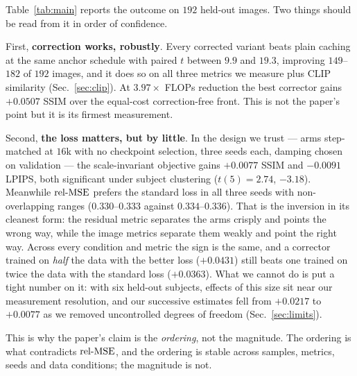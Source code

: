 Table~\ref{tab:main} reports the outcome on $192$ held-out images. Two things should
be read from it in order of confidence.

First, \textbf{correction works, robustly}. Every corrected variant beats plain caching
at the same anchor schedule with paired $t$ between $9.9$ and $19.3$, improving
$149$--$182$ of $192$ images, and it does so on all three metrics we measure plus CLIP
similarity (Sec.~\ref{sec:clip}). At $3.97\times$ FLOPs reduction the best corrector
gains $+0.0507$ SSIM over the equal-cost correction-free front. This is not the
paper's point but it is its firmest measurement.

Second, \textbf{the loss matters, but by little}. In the design we trust --- arms
step-matched at $16$k with no checkpoint selection, three seeds each, damping chosen on
validation --- the scale-invariant objective gains $+0.0077$ SSIM and $-0.0091$ LPIPS,
both significant under subject clustering ($t(5){=}2.74$, $-3.18$). Meanwhile
$\mathrm{rel\text{-}MSE}$ prefers the standard loss in all three seeds with non-overlapping ranges
($0.330$--$0.333$ against $0.334$--$0.336$). That is the inversion in its cleanest
form: the residual metric separates the arms crisply and points the wrong way, while
the image metrics separate them weakly and point the right way. Across every condition and metric the sign is the same, and a
corrector trained on \emph{half} the data with the better loss ($+0.0431$) still beats
one trained on twice the data with the standard loss ($+0.0363$). What we cannot do is
put a tight number on it: with six held-out subjects, effects of this size sit near our
measurement resolution, and our successive estimates fell from $+0.0217$ to $+0.0077$
as we removed uncontrolled degrees of freedom (Sec.~\ref{sec:limits}).

This is why the paper's claim is the \emph{ordering}, not the magnitude. The ordering
is what contradicts $\mathrm{rel\text{-}MSE}$, and the ordering is stable across samples, metrics,
seeds and data conditions; the magnitude is not.

